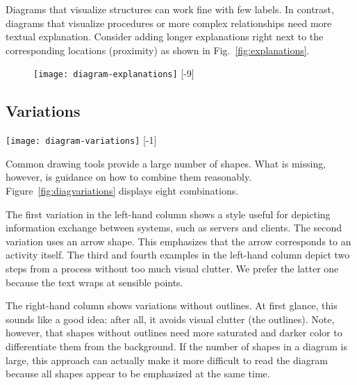 Diagrams that visualize structures can work fine with few labels. In contrast, diagrams that visualize procedures or more complex relationships need more textual explanation. Consider adding longer explanations right next to the corresponding locations (proximity) as shown in Fig.~\ref{fig:explanations}.

\begin{figure}[t]
\centering
\texttt{[image: diagram-explanations]} 
[-9\baselineskip]
\end{figure}


\subsection{Variations}

\begin{figure*}[t]
\centering
\texttt{[image: diagram-variations]}
[-1\baselineskip]
\end{figure*}

Common drawing tools provide a large number of shapes. What is missing, however, is guidance on how to combine them reasonably. Figure~\ref{fig:diagvariations} displays eight combinations.

The first variation in the left-hand column shows a style useful for depicting information exchange between systems, such as servers and clients. The second variation uses an arrow shape. This emphasizes that the arrow corresponds to an activity itself. The third and fourth examples in the left-hand column depict two steps from a process without too much visual clutter. We prefer the latter one because the text wraps at sensible points.

The right-hand column shows variations without outlines. At first glance, this sounds like a good  idea: after all, it avoids visual clutter (the outlines). Note, however, that shapes without outlines need more saturated and darker color to differentiate them from the background.  If the number of shapes in a diagram is large, this approach can actually make it more difficult to read the diagram because all shapes appear to be emphasized at the same time.

